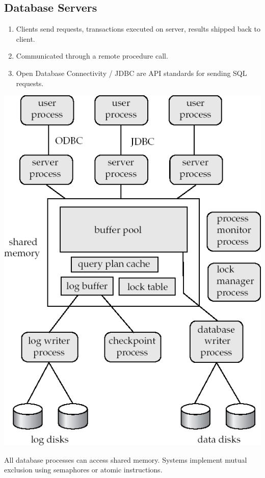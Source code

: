 \documentclass[twocolumn,english]{article}
\begin{document}
\subsection{Database Servers}
\begin{enumerate}
\item Clients send requests, transactions executed on server, results shipped
back to client.
\item Communicated through a remote procedure call.
\item Open Database Connectivity / JDBC are API standards for sending SQL
requests.
\end{enumerate}
\begin{center}
\includegraphics[scale=0.2]{img/database-processes}
\par\end{center}

\noindent All database processes can access shared memory. Systems
implement mutual exclusion using semaphores or atomic instructions.
\end{document}
